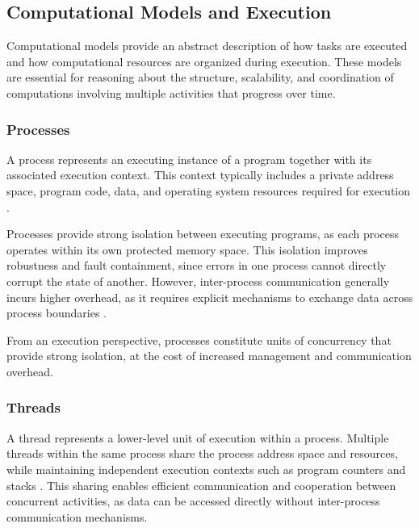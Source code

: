 \subsection{Computational Models and Execution}
\hspace{\parindent}
Computational models provide an abstract description of how tasks are executed and how
computational resources are organized during execution. These models are essential for reasoning
about the structure, scalability, and coordination of computations involving multiple activities
that progress over time.

\subsubsection{Processes}
\hspace{\parindent}
A process represents an executing instance of a program together with its associated execution
context. This context typically includes a private address space, program code, data, and
operating system resources required for execution \cite{tanenbaum2015modern}.

Processes provide strong isolation between executing programs, as each process operates within
its own protected memory space. This isolation improves robustness and fault containment, since
errors in one process cannot directly corrupt the state of another. However, inter-process
communication generally incurs higher overhead, as it requires explicit mechanisms to exchange
data across process boundaries \cite{silberschatz2018operating}.

From an execution perspective, processes constitute units of concurrency that provide strong
isolation, at the cost of increased management and communication overhead.



\subsubsection{Threads}
\hspace{\parindent}
A thread represents a lower-level unit of execution within a process. Multiple threads within
the same process share the process address space and resources, while maintaining independent
execution contexts such as program counters and stacks \cite{tanenbaum2015modern}. This sharing
enables efficient communication and cooperation between concurrent activities, as data can be
accessed directly without inter-process communication mechanisms.

